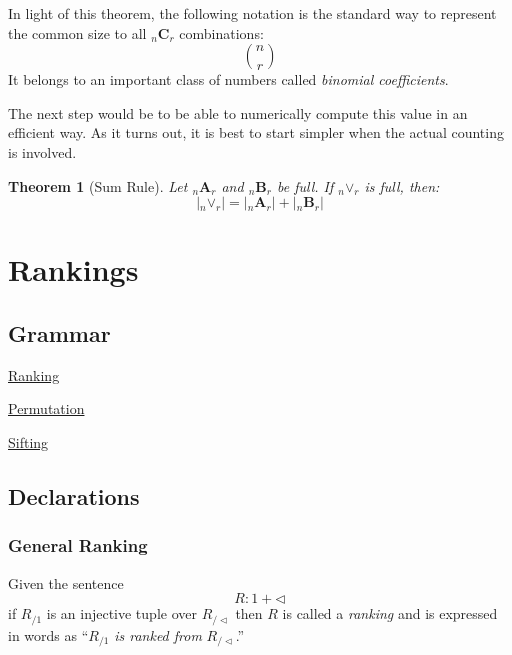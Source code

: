 \documentclass[twoside]{book}
\newcommand{\pass}[1][\Diamond]{\ensuremath{{_{\!/{#1}}}}}
\newcommand{\syntax}[1][\Diamond]{\ensuremath{1+{#1}}}
\newcommand{\nCr}[1][C]{\ensuremath{{_n{\mathbf #1}_r}}}
\newcommand{\nORr}[1][\vee]{\ensuremath{{{_n{\mathbf #1}_r}}}}
\newtheorem{theorem}{Theorem}[section]
\newenvironment{proof}[1][Proof]{\begin{trivlist}
\item[\hskip \labelsep {\bfseries #1}]}{\end{trivlist}}
\newenvironment{definition}[1][Definition]{\begin{trivlist}
\item[\hskip \labelsep {\bfseries Definition (#1):}]}{\end{trivlist}}
\newcommand{\qed}{\nobreak \ifvmode \relax \else
      \ifdim\lastskip<1.5em \hskip-\lastskip
      \hskip1.5em plus0em minus0.5em \fi \nobreak
      \vrule height0.5em width0.5em depth0.25em\fi}
\begin{document}
In light of this theorem, the following notation is the standard way to represent the common size to all $ \nCr $
combinations:
$$ {n\choose r} $$
It belongs to an important class of numbers called \emph{binomial coefficients}.

The next step would be to be able to numerically compute this value in an efficient way.  As it turns out, it
is best to start simpler when the actual counting is involved.

\begin{theorem}[Sum Rule]

Let $ \nCr[A] $ and $ \nCr[B] $ be full.  If $ \nORr $ is full, then:
$$ |\nORr|=|\nCr[A]|+|\nCr[B]| $$

\end{theorem}

\begin{proof}

\qed

\end{proof}

\chapter{Rankings}

\section{Grammar}

\indent\hypertarget{oRanking}{\hyperlink{Ranking}{Ranking}}
\indent\hypertarget{oPermutation}{\hyperlink{Permutation}{Permutation}}
\indent\hypertarget{oSifting}{\hyperlink{Sifting}{Sifting}}

\section{Declarations}

\subsection{General Ranking}

\begin{definition}[\hypertarget{Ranking}{\hyperlink{oRanking}{Ranking}}]

Given the sentence
$$ R:\syntax[\lhd] $$
if $ R\pass[1] $ is an injective tuple over $ R\pass[\lhd] $ then $ R $ is called a \emph{ranking}
and is expressed in words as ``$ R\pass[1] $ \emph{is ranked from} $ R\pass[\lhd] $.''

\end{definition}
\end{document}
